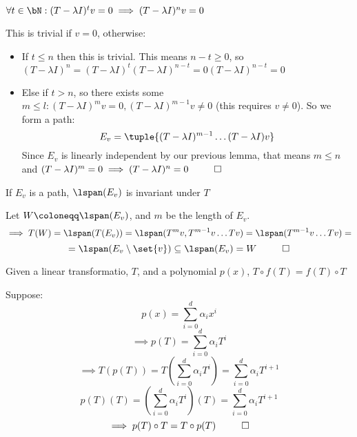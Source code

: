 \documentclass[10pt]{article}
\begin{document}
\begin{lemma}[expToZeroLemma]{$\forall t\in\bN: (T-\lambda I)^tv=0\implies (T-\lambda I)^nv=0$}

This is trivial if $v=0$, otherwise:

\begin{itemize}
    \item If $t\leq n$ then this is trivial. This means $n-t\geq0$, so $(T-\lambda I)^n = (T-\lambda I)^t(T-\lambda I)^{n-t} = 0(T-\lambda I)^{n-t}=0$
    \item Else if $t>n$, so there exists some $m\leq l: (T-\lambda I)^mv=0, (T-\lambda I)^{m-1}v\neq0$ (this requires $v\neq0$). So we form a path:
    \[ E_v = \tuple{(T-\lambda I)^{m-1}\dots (T-\lambda I)v} \]
    Since $E_v$ is linearly independent by our previous lemma, that means $m\leq n$ and $(T-\lambda I)^m=0\implies (T-\lambda I)^n=0 ~~ \qed$
\end{itemize}

\end{lemma}

\newpage
\begin{lemma}[pathInvarLemma]{If $E_v$ is a path, $\lspan(E_v)$ is invariant under $T$}

Let $W\coloneqq\lspan(E_v)$, and $m$ be the length of $E_v$.
\[ \implies T(W) = \lspan(T(E_v)) = \lspan(T^mv,T^{m-1}v\dots Tv) = \lspan(T^{m-1}v\dots Tv) = \]
\[ = \lspan(E_v\setminus\set{v}) \subseteq \lspan(E_v) = W ~~ \qed \]

\end{lemma}

\begin{lemma}{Given a linear transformatio, $T$, and a polynomial $p(x)$, $T\circ f(T) = f(T) \circ T$}

Suppose:
\[ p(x) = \sum_{i=0}^d \alpha_i x^i \]
\[ \implies p(T) = \sum_{i=0}^d \alpha_i T^i \]
\[ \implies T(p(T)) = T(\sum_{i=0}^d \alpha_i T^i) = \sum_{i=0}^d \alpha_i T^{i+1} \]
\[ p(T)(T) = (\sum_{i=0}^d \alpha_i T^i)(T) = \sum_{i=0}^d \alpha_i T^{i+1} \]
\[ \implies p(T)\circ T = T\circ p(T)  ~~ \qed \]

\end{lemma}
\end{document}
